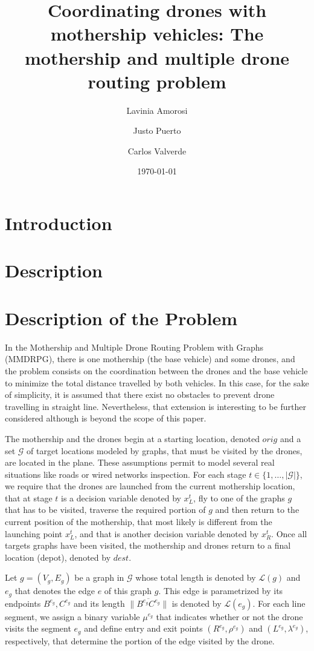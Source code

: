 \documentclass[10pt,a4paper]{article}
\title{Coordinating drones with mothership vehicles: The mothership and multiple drone routing problem}
\author{Lavinia Amorosi \and Justo Puerto \and Carlos Valverde}
\date{\today}
\newcommand{\LA}[1]{{\color{blue}#1}}
\begin{document}
\section{Introduction}

\section{Description}
\section{Description of the Problem}
In the Mothership and Multiple Drone Routing Problem with Graphs (MMDRPG), there is one mothership (the base vehicle) and some drones, and the problem consists on the coordination between the drones and the base vehicle to minimize the total distance travelled by both vehicles. In this case, for the sake of simplicity, \LA{it is assumed} that there exist no obstacles to prevent drone travelling in straight line. Nevertheless, that extension is interesting to be further considered although is beyond the scope of this paper.

The mothership and the drones begin at a starting location, denoted $orig$ \LA{and a set $\mathcal G$ of target locations modeled by graphs, that must be visited by the drones, are located in the plane. These assumptions permit to model several real situations like roads or wired networks inspection.}
For each stage $t \in \{1, \ldots, |\mathcal G|\}$, we require that the drones are launched from the current mothership location, that at stage $t$ is a decision variable denoted by $x_L^t$, fly to one of the graphs $g$ that has to be visited, traverse the required portion of $g$ and then return to the current position of the mothership, that most likely is different from the launching point $x_L^t$, and that is another decision variable denoted by $x_R^t$. Once all targets graphs have been visited, the mothership and drones return to a final location (depot), denoted by $dest$.

Let $g = (V_g, E_g)$ be a graph in $\mathcal G$ whose total length is denoted by $\mathcal L(g)$ and $e_g$ that denotes the edge $e$ of this graph $g$. This edge is parametrized by its endpoints $B^{e_g}, C^{e_g}$ and its length $\|\overline{B^{e_g}C^{e_g}}\|$ is denoted by $\mathcal L(e_g)$. For each line segment, we assign a binary variable $\mu^{e_g}$ that indicates whether or not the drone visits the segment $e_g$ and define entry and exit points $(R^{e_g}, \rho^{e_g})$ and $(L^{e_g}, \lambda^{e_g})$, respectively, that determine the portion of the edge visited by the drone.
\end{document}
